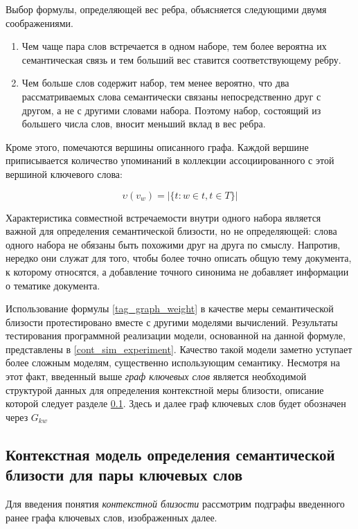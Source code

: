 Выбор формулы, определяющей вес ребра, объясняется следующими двумя соображениями.
\begin{enumerate}
    \item Чем чаще пара слов встречается в одном наборе, тем более вероятна их семантическая связь и тем больший вес ставится соответствующему ребру.
    \item Чем больше слов содержит набор, тем менее вероятно, что два рассматриваемых слова семантически связаны непосредственно друг с другом, а не с другими словами набора. Поэтому набор, состоящий из большего числа слов, вносит меньший вклад в вес ребра.
\end{enumerate}

Кроме этого, помечаются вершины описанного графа. Каждой вершине приписывается количество упоминаний в коллекции ассоциированного с этой вершиной ключевого слова:

$$ \upsilon(v_w) = |\{t : w \in t, t \in T\}| $$

Характеристика совместной встречаемости внутри одного набора является важной для определения семантической близости, но не определяющей: слова одного набора не обязаны быть похожими друг на друга по смыслу. Напротив, нередко они служат для того, чтобы более точно описать общую тему документа, к которому относятся, а добавление точного синонима не добавляет информации о тематике документа. 

Использование формулы \ref{tag_graph_weight} в качестве меры семантической близости протестировано вместе с другими моделями вычислений. Результаты тестирования программной реализации модели, основанной на данной формуле, представлены в \ref{cont_sim_experiment}. Качество такой модели заметно уступает более сложным моделям, существенно использующим семантику. Несмотря на этот факт, введенный выше \emph{граф ключевых слов} является необходимой структурой данных для определения контекстной меры близости, описание которой следует разделе \ref{cont_sim}. Здесь и далее граф ключевых слов будет обозначен через $G_{kw}$

\subsection{Контекстная модель определения семантической близости для пары ключевых слов} \label{cont_sim}

Для введения понятия \emph{контекстной близости} рассмотрим подграфы введенного ранее графа ключевых слов, изображенных далее.

